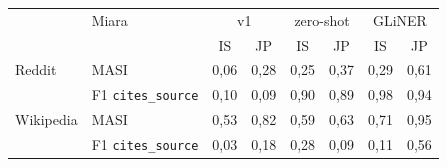 \begin{tabular}{llcccccc}
\toprule
 & Miara & \multicolumn{2}{c}{v1} & \multicolumn{2}{c}{zero-shot} & \multicolumn{2}{c}{GLiNER} \\
 &  & IS & JP & IS & JP & IS & JP \\
\midrule
Reddit & MASI & 0{,}06 & 0{,}28 & 0{,}25 & 0{,}37 & 0{,}29 & 0{,}61 \\
 & F1 \texttt{cites\_source} & 0{,}10 & 0{,}09 & 0{,}90 & 0{,}89 & 0{,}98 & 0{,}94 \\
\midrule
Wikipedia & MASI & 0{,}53 & 0{,}82 & 0{,}59 & 0{,}63 & 0{,}71 & 0{,}95 \\
 & F1 \texttt{cites\_source} & 0{,}03 & 0{,}18 & 0{,}28 & 0{,}09 & 0{,}11 & 0{,}56 \\
\bottomrule
\end{tabular}
